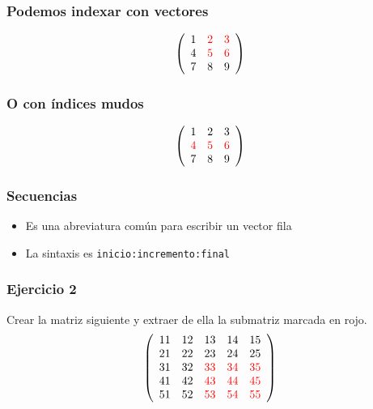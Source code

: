 \documentclass[12pt]{beamer}
\begin{document}
\begin{large}

\begin{frame}
\frametitle{Podemos indexar con vectores}
\[ \left(
\begin{array}{ccc}
1&\textcolor{red}{2}&\textcolor{red}{3}\\
4&\textcolor{red}{5}&\textcolor{red}{6}\\
7&8&9
\end{array} \right)
\]
\testcode
\end{frame}


\begin{frame}
\frametitle{O con índices mudos}
\[ \left(
\begin{array}{ccc}
1&2&3\\
\textcolor{red}{4}&\textcolor{red}{5}&\textcolor{red}{6}\\
7&8&9
\end{array} \right)
\]
\testcode
\end{frame}

\testcode{
\begin{lstlisting}
\end{lstlisting}
}



\begin{frame}
\frametitle{Secuencias}
\begin{itemize}
\item Es una abreviatura común para escribir un vector fila
\item La sintaxis es \texttt{inicio:incremento:final}
\end{itemize}
\testcode
\end{frame}

\begin{frame}
\frametitle{Ejercicio 2} 
Crear la matriz siguiente y extraer de ella la submatriz marcada en rojo.
\[ \left( \begin{array}{ccccc}
11&12&13&14&15\\
21&22&23&24&25\\
31&32&\textcolor{red}{33}&\textcolor{red}{34}&\textcolor{red}{35}\\
41&42&\textcolor{red}{43}&\textcolor{red}{44}&\textcolor{red}{45}\\
51&52&\textcolor{red}{53}&\textcolor{red}{54}&\textcolor{red}{55}
\end{array} \right) \]
\end{frame}


\end{large}
\end{document}
